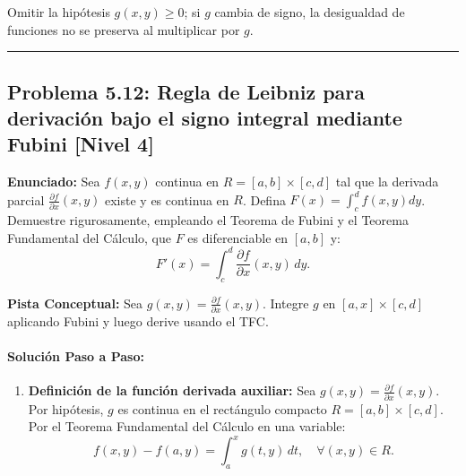 \documentclass[11pt,a4paper]{article}
\begin{document}
\begin{trapbox}
Omitir la hipótesis $g(x,y) \ge 0$; si $g$ cambia de signo, la desigualdad de funciones no se preserva al multiplicar por $g$.
\end{trapbox}

\vspace{0.5cm}
\hrule
\vspace{0.5cm}

\subsection*{Problema 5.12: Regla de Leibniz para derivación bajo el signo integral mediante Fubini \hfill \color{primaryblue}\small[Nivel 4]}

\begin{tcolorbox}[colback=white,colframe=gray!40,arc=1mm,boxrule=0.5pt,left=3mm,right=3mm,top=2mm,bottom=2mm]
\textbf{Enunciado:} Sea $f(x,y)$ continua en $R = [a,b] \times [c,d]$ tal que la derivada parcial $\frac{\partial f}{\partial x}(x,y)$ existe y es continua en $R$. Defina $F(x) = \int_c^d f(x,y) dy$. Demuestre rigurosamente, empleando el Teorema de Fubini y el Teorema Fundamental del Cálculo, que $F$ es diferenciable en $[a,b]$ y:
\begin{equation*}
F'(x) = \int_c^d \frac{\partial f}{\partial x}(x,y) \, dy.
\end{equation*}
\end{tcolorbox}

\begin{tcolorbox}[colback=yellow!4,colframe=accentamber!70,arc=1mm,boxrule=0.5pt,left=3mm,right=3mm,top=1.5mm,bottom=1.5mm]
\textbf{Pista Conceptual:} Sea $g(x,y) = \frac{\partial f}{\partial x}(x,y)$. Integre $g$ en $[a, x] \times [c, d]$ aplicando Fubini y luego derive usando el TFC.
\end{tcolorbox}

\paragraph{Solución Paso a Paso:}\par
\begin{enumerate}[label=\textbf{\arabic*.}]
\item \textbf{Definición de la función derivada auxiliar:}
Sea $g(x,y) = \frac{\partial f}{\partial x}(x,y)$.
Por hipótesis, $g$ es continua en el rectángulo compacto $R = [a,b] \times [c,d]$.
Por el Teorema Fundamental del Cálculo en una variable:
\begin{equation*}
f(x, y) - f(a, y) = \int_a^x g(t, y) \, dt, \quad \forall (x,y) \in R.
\end{equation*}
\end{enumerate}
\end{document}
